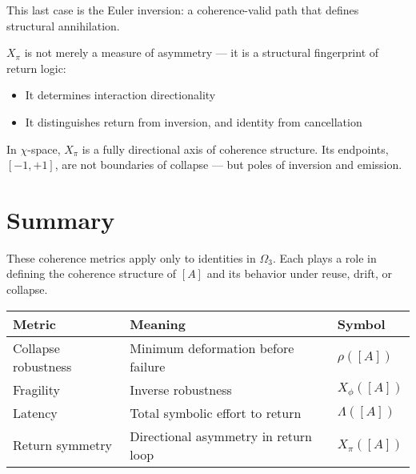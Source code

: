 This last case is the Euler inversion: a coherence-valid path that defines structural annihilation.

$X_\pi$ is not merely a measure of asymmetry — it is a structural fingerprint of return logic:
\begin{itemize}
  \item It determines interaction directionality
  \item It distinguishes return from inversion, and identity from cancellation
\end{itemize}

In $\chi$-space, $X_\pi$ is a fully directional axis of coherence structure.  
Its endpoints, $[-1, +1]$, are not boundaries of collapse — but poles of inversion and emission.

\section{Summary}

These coherence metrics apply only to identities in $\Omega_3$.  
Each plays a role in defining the coherence structure of $[A]$ and its behavior under reuse, drift, or collapse.

\begin{center}
\begin{tabular}{|l|l|l|}
\hline
\textbf{Metric} & \textbf{Meaning} & \textbf{Symbol} \\
\hline
Collapse robustness & Minimum deformation before failure & $\rho([A])$ \\
Fragility            & Inverse robustness                 & $X_\phi([A])$ \\
Latency              & Total symbolic effort to return    & $\Lambda([A])$ \\
Return symmetry      & Directional asymmetry in return loop & $X_\pi([A])$ \\
\hline
\end{tabular}
\end{center}
